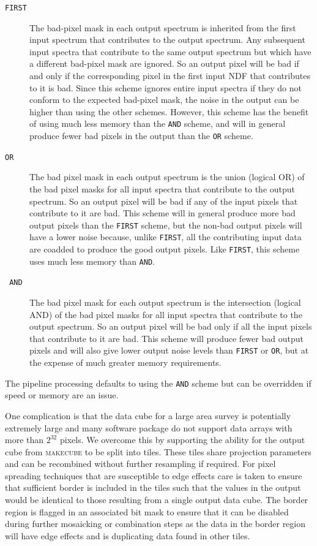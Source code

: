\documentclass[final,authoryear,5p,times,twocolumn]{elsarticle}
\begin{document}
\begin{description}
\item[\texttt{FIRST}] The bad-pixel mask in each output spectrum is
  inherited from the first input spectrum that contributes to the
  output spectrum. Any subsequent input spectra that contribute to the
  same output spectrum but which have a different bad-pixel mask are
  ignored. So an output pixel will be bad if and only if the
  corresponding pixel in the first input NDF that contributes to it is
  bad. Since this scheme ignores entire input spectra if they do not
  conform to the expected bad-pixel mask, the noise in the output can
  be higher than using the other schemes. However, this scheme has the
  benefit of using much less memory than the \texttt{AND} scheme, and
  will in general produce fewer bad pixels in the output than the
  \texttt{OR} scheme.

\item[\texttt{OR}] The bad pixel mask in each output spectrum is the
  union (logical OR) of the bad pixel masks for all input spectra that
  contribute to the output spectrum. So an output pixel will be bad if
  any of the input pixels that contribute to it are bad.  This scheme
  will in general produce more bad output pixels than the
  \texttt{FIRST} scheme, but the non-bad output pixels will have a
  lower noise because, unlike \texttt{FIRST}, all the contributing
  input data are coadded to produce the good output pixels. Like
  \texttt{FIRST}, this scheme uses much less memory than \texttt{AND}.

\item[\texttt{ AND}] The bad pixel mask for each output spectrum is
  the intersection (logical AND) of the bad pixel masks for all input
  spectra that contribute to the output spectrum. So an output pixel
  will be bad only if all the input pixels that contribute to it are
  bad. This scheme will produce fewer bad output pixels and will also
  give lower output noise levels than \texttt{FIRST} or \texttt{OR},
  but at the expense of much greater memory requirements.

\end{description}

The pipeline processing defaults to using the \texttt{AND} scheme but
can be overridden if speed or memory are an issue.

One complication is that the data cube for a large area survey is
potentially extremely large and many software package do not support
data arrays with more than $2^{32}$ pixels. We overcome this by
supporting the ability for the output cube from \textsc{makecube} to
be split into tiles. These tiles share projection parameters and can
be recombined without further resampling if required. For pixel
spreading techniques that are susceptible to edge effects care is
taken to ensure that sufficient border is included in the tiles such
that the values in the output would be identical to those resulting
from a single output data cube. The border region is flagged in an
associated bit mask to ensure that it can be disabled during further
mosaicking or combination steps as the data in the border region will
have edge effects and is duplicating data found in other tiles.
\end{document}
